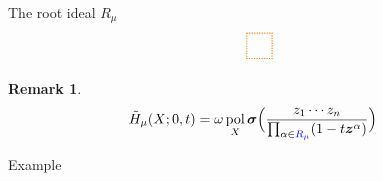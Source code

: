 \documentclass[dvipsnames]{beamer}
\newcommand{\zz}{{\boldsymbol z}}
\newcommand{\sigmabold}{\boldsymbol \sigma}
\newcommand{\Htild}{\tilde{H}}
\DeclareMathOperator{\pol}{pol}
\theoremstyle{definition}
\newtheorem{rmk}[thm]{Remark}
\newcommand{\colorb}[1]{\textcolor{blue}{#1}}
\newcounter{c}
\begin{document}
\begin{frame}{The root ideal \(R_\mu\)}
\begin{align*}
\begin{tikzpicture}[scale=.213]
\draw[thick, densely dotted, orange] (7,-7) rectangle (10,-10);
\end{tikzpicture}
\end{align*}
\vspace{-0.5cm}
\pause
\begin{rmk}
  \begin{align*}
    \Htild_\mu(X;0,t) 
    & =
      \omega \pol_X \sigmabold
      \Big( \frac{z_1\cdots z_n}{\prod_{\alpha \in
      \colorb{R_\mu}}(1 - t \zz^\alpha)} 
      \Big)
  \end{align*}
\end{rmk}
\end{frame}

\begin{frame}{Example}
  \begin{overlayarea}{\textwidth}{\textheight}


\end{overlayarea}
\end{frame}
\end{document}
